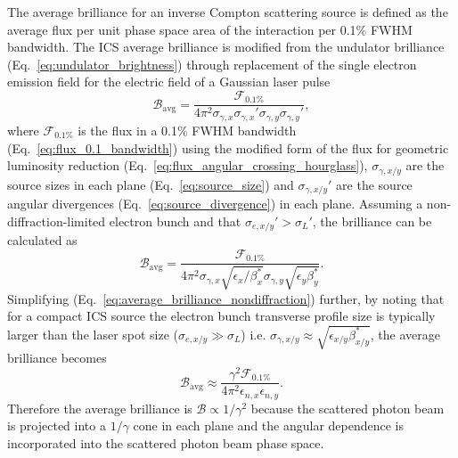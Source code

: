 \documentclass[../main.tex]{subfiles}
\begin{document}
The average brilliance for an inverse Compton scattering source is defined as the average flux per unit phase space area of the interaction per 0.1\% FWHM bandwidth. The ICS average brilliance is modified from the undulator brilliance (Eq.~\ref{eq:undulator_brightness}) through replacement of the single electron emission field for the electric field of a Gaussian laser pulse \cite{krafft2010compton,deitrick2018high}
\begin{equation}
\mathcal{B}_{\mathrm{avg}} = \frac{\mathcal{F}_{0.1\%}}{4\pi^{2}\sigma_{\gamma,x}\sigma_{\gamma,x}'\sigma_{\gamma,y}\sigma_{\gamma,y}'},
\label{eq:average_brilliance}
\end{equation}
where $\mathcal{F}_{0.1\%}$ is the flux in a 0.1\% FWHM bandwidth (Eq.~\ref{eq:flux_0.1_bandwidth}) using the modified form of the flux for geometric luminosity reduction (Eq.~\ref{eq:flux_angular_crossing_hourglass}), $\sigma_{\gamma,x/y}$ are the source sizes in each plane (Eq.~\ref{eq:source_size}) and $\sigma_{\gamma,x/y}'$ are the source angular divergences (Eq.~\ref{eq:source_divergence}) in each plane. Assuming a non-diffraction-limited electron bunch and that $\sigma_{e,x/y}' > \sigma_{L}'$, the brilliance can be calculated as
\begin{equation}
\mathcal{B}_{\mathrm{avg}} = \frac{\mathcal{F}_{0.1\%}}{4\pi^{2}\sigma_{\gamma,x}\sqrt{\epsilon_{x}/\beta_{x}^{*}}\sigma_{\gamma,y}\sqrt{\epsilon_{y}\beta_{y}^{*}}}.
\label{eq:average_brilliance_nondiffraction}    
\end{equation}
Simplifying (Eq.~\ref{eq:average_brilliance_nondiffraction}) further, by noting that for a compact ICS source the electron bunch transverse profile size is typically larger than the laser spot size ($\sigma_{e,x/y}\gg\sigma_{L}$) i.e. $\sigma_{\gamma,x/y} \approx \sqrt{\epsilon_{x/y}\beta_{x/y}^{*}}$, the average brilliance becomes
\begin{equation}
\mathcal{B}_{\mathrm{avg}} \approx \frac{\gamma^{2}\mathcal{F}_{0.1\%}}{4\pi^{2}\epsilon_{n,x}\epsilon_{n,y}}.
\label{eq:average_brilliance_compact}    
\end{equation}
Therefore the average brilliance is $\mathcal{B}\propto 1/\gamma^{2}$ because the scattered photon beam is projected into a $1/\gamma$ cone in each plane and the angular dependence is incorporated into the scattered photon beam phase space.   
\end{document}
